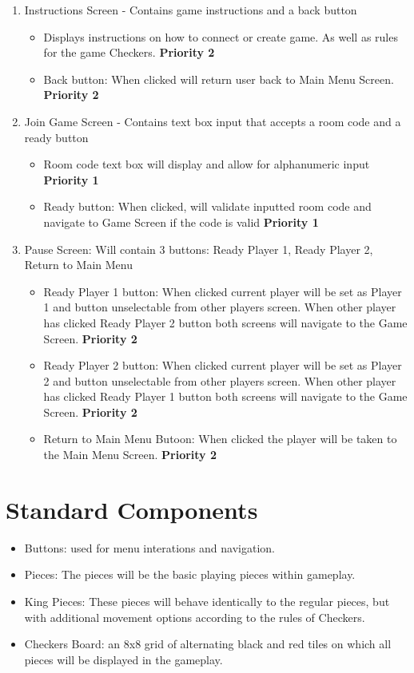 \documentclass[10pt]{article}
\begin{document}
\begin{enumerate}
\item Instructions Screen - Contains game instructions and a back button
\begin{itemize}
    \item Displays instructions on how to connect or create game. As well as rules for the game Checkers. \textbf{Priority 2} 
    \item Back button: When clicked will return user back to Main Menu Screen. \textbf{Priority 2} 
\end{itemize}

\item Join Game Screen - Contains text box input that accepts a room code and a ready button
\begin{itemize}
    \item Room code text box will display and allow for alphanumeric input \textbf{Priority 1} 
    \item Ready button: When clicked, will validate inputted room code and navigate to Game Screen if the code is valid \textbf{Priority 1} 
\end{itemize}

\item Pause Screen: Will contain 3 buttons: Ready Player 1, Ready Player 2, Return to Main Menu
\begin{itemize}
    \item Ready Player 1 button: When clicked current player will be set as Player 1 and button unselectable from other players screen. When other player has clicked Ready Player 2 button both screens will navigate to the Game Screen. \textbf{Priority 2}
    \item Ready Player 2 button: When clicked current player will be set as Player 2 and button unselectable from other players screen. When other player has clicked Ready Player 1 button both screens will navigate to the Game Screen. \textbf{Priority 2}
    \item Return to Main Menu Butoon: When clicked the player will be taken to the Main Menu Screen. \textbf{Priority 2}
\end{itemize}

\end{enumerate}

\section{Standard Components}

\begin{itemize}
    \item Buttons: used for menu interations and navigation.
    \item Pieces: The pieces will be the basic playing pieces within gameplay.
    \item King Pieces: These pieces will behave identically to the regular pieces, but with additional movement options according to the rules of Checkers.
    \item Checkers Board: an 8x8 grid of alternating black and red tiles on which all pieces will be displayed in the gameplay.
\end{itemize}
\end{document}
